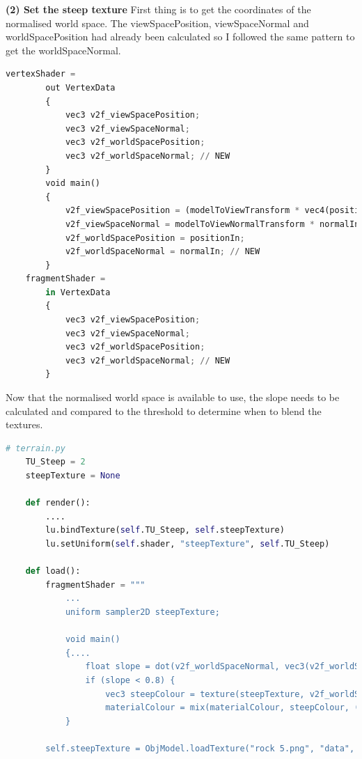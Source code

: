 \documentclass[a4 paper, 12pt]{article}
\begin{document}
\textbf{(2) Set the steep texture}
First thing is to get the coordinates of the normalised world space. The viewSpacePosition, viewSpaceNormal and worldSpacePosition had already been calculated so I followed the same pattern to get the worldSpaceNormal.

    \begin{lstlisting}[language=python]
    vertexShader =
        out VertexData
        {
            vec3 v2f_viewSpacePosition;
            vec3 v2f_viewSpaceNormal;
            vec3 v2f_worldSpacePosition;
            vec3 v2f_worldSpaceNormal; // NEW
        }
        void main()
        {
            v2f_viewSpacePosition = (modelToViewTransform * vec4(positionIn, 1.0)).xyz;
            v2f_viewSpaceNormal = modelToViewNormalTransform * normalIn;
            v2f_worldSpacePosition = positionIn;
            v2f_worldSpaceNormal = normalIn; // NEW
        }
    fragmentShader = 
        in VertexData
        {
            vec3 v2f_viewSpacePosition;
            vec3 v2f_viewSpaceNormal;
            vec3 v2f_worldSpacePosition;
            vec3 v2f_worldSpaceNormal; // NEW
        }
    \end{lstlisting}

    Now that the normalised world space is available to use, the slope needs to be calculated and compared to the threshold to determine when to blend the textures.

    \begin{lstlisting}[language=python]
    # terrain.py
    TU_Steep = 2
    steepTexture = None

    def render():
        ....
        lu.bindTexture(self.TU_Steep, self.steepTexture)
        lu.setUniform(self.shader, "steepTexture", self.TU_Steep)

    def load():
        fragmentShader = """
            ...
            uniform sampler2D steepTexture;

            void main()
            {....
                float slope = dot(v2f_worldSpaceNormal, vec3(v2f_worldSpaceNormal.x, 0.0, v2f_worldSpaceNormal.z));
                if (slope < 0.8) {
                    vec3 steepColour = texture(steepTexture, v2f_worldSpacePosition.xy * terrainTextureXyScale).xyz;
                    materialColour = mix(materialColour, steepColour, (v2f_height/terrainHeightScale));
            } 

        self.steepTexture = ObjModel.loadTexture("rock 5.png", "data", True)
    \end{lstlisting}
\end{document}
